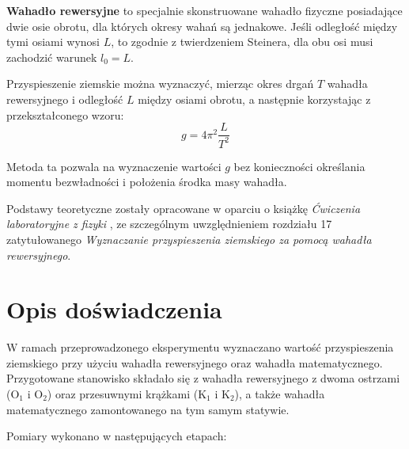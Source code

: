 \documentclass[a4paper,12pt]{article}
\begin{document}
\textbf{Wahadło rewersyjne} to specjalnie skonstruowane wahadło fizyczne posiadające dwie osie obrotu, dla których okresy wahań są jednakowe. Jeśli odległość między tymi osiami wynosi $L$, to zgodnie z twierdzeniem Steinera, dla obu osi musi zachodzić warunek $l_0 = L$. 

Przyspieszenie ziemskie można wyznaczyć, mierząc okres drgań $T$ wahadła rewersyjnego i odległość $L$ między osiami obrotu, a następnie korzystając z przekształconego wzoru:
\begin{equation}
\label{eq:przyspieszenie}
g = 4\pi^2\frac{L}{T^2}
\end{equation}

Metoda ta pozwala na wyznaczenie wartości $g$ bez konieczności określania momentu bezwładności i położenia środka masy wahadła.

Podstawy teoretyczne zostały opracowane w oparciu o książkę \textit{Ćwiczenia laboratoryjne z fizyki} \cite{Drynski1976}, ze szczególnym uwzględnieniem rozdziału 17 zatytułowanego \textit{Wyznaczanie przyspieszenia ziemskiego za pomocą wahadła rewersyjnego}.

\section{Opis doświadczenia}

W ramach przeprowadzonego eksperymentu wyznaczano wartość przyspieszenia ziemskiego przy użyciu wahadła rewersyjnego oraz wahadła matematycznego. Przygotowane stanowisko składało się z wahadła rewersyjnego z dwoma ostrzami (O$_1$ i O$_2$) oraz przesuwnymi krążkami (K$_1$ i K$_2$), a także wahadła matematycznego zamontowanego na tym samym statywie.

Pomiary wykonano w następujących etapach:
\end{document}

